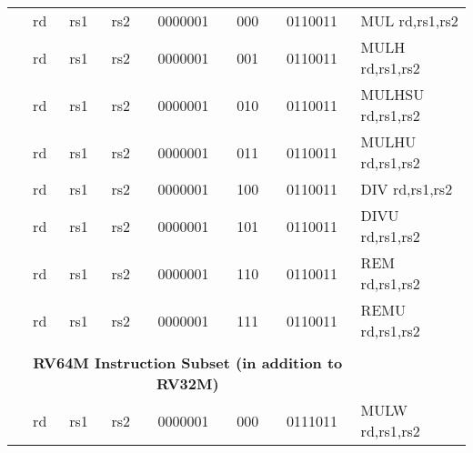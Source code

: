 \begin{table}[p]
\begin{small}
\begin{center}
\begin{tabular}{rccccccccccl}
&
\multicolumn{1}{|c|}{rd} &
\multicolumn{1}{c|}{rs1} &
\multicolumn{1}{c|}{rs2} &
\multicolumn{4}{c|}{0000001} &
\multicolumn{2}{c|}{000} &
\multicolumn{1}{c|}{0110011} & MUL rd,rs1,rs2 \\
\cline{2-11}
  

&
\multicolumn{1}{|c|}{rd} &
\multicolumn{1}{c|}{rs1} &
\multicolumn{1}{c|}{rs2} &
\multicolumn{4}{c|}{0000001} &
\multicolumn{2}{c|}{001} &
\multicolumn{1}{c|}{0110011} & MULH rd,rs1,rs2 \\
\cline{2-11}
  

&
\multicolumn{1}{|c|}{rd} &
\multicolumn{1}{c|}{rs1} &
\multicolumn{1}{c|}{rs2} &
\multicolumn{4}{c|}{0000001} &
\multicolumn{2}{c|}{010} &
\multicolumn{1}{c|}{0110011} & MULHSU rd,rs1,rs2 \\
\cline{2-11}
  

&
\multicolumn{1}{|c|}{rd} &
\multicolumn{1}{c|}{rs1} &
\multicolumn{1}{c|}{rs2} &
\multicolumn{4}{c|}{0000001} &
\multicolumn{2}{c|}{011} &
\multicolumn{1}{c|}{0110011} & MULHU rd,rs1,rs2 \\
\cline{2-11}
  

&
\multicolumn{1}{|c|}{rd} &
\multicolumn{1}{c|}{rs1} &
\multicolumn{1}{c|}{rs2} &
\multicolumn{4}{c|}{0000001} &
\multicolumn{2}{c|}{100} &
\multicolumn{1}{c|}{0110011} & DIV rd,rs1,rs2 \\
\cline{2-11}
  

&
\multicolumn{1}{|c|}{rd} &
\multicolumn{1}{c|}{rs1} &
\multicolumn{1}{c|}{rs2} &
\multicolumn{4}{c|}{0000001} &
\multicolumn{2}{c|}{101} &
\multicolumn{1}{c|}{0110011} & DIVU rd,rs1,rs2 \\
\cline{2-11}
  

&
\multicolumn{1}{|c|}{rd} &
\multicolumn{1}{c|}{rs1} &
\multicolumn{1}{c|}{rs2} &
\multicolumn{4}{c|}{0000001} &
\multicolumn{2}{c|}{110} &
\multicolumn{1}{c|}{0110011} & REM rd,rs1,rs2 \\
\cline{2-11}
  

&
\multicolumn{1}{|c|}{rd} &
\multicolumn{1}{c|}{rs1} &
\multicolumn{1}{c|}{rs2} &
\multicolumn{4}{c|}{0000001} &
\multicolumn{2}{c|}{111} &
\multicolumn{1}{c|}{0110011} & REMU rd,rs1,rs2 \\
\cline{2-11}
  

&
\multicolumn{10}{c}{} & \\
&
\multicolumn{10}{c}{\bf RV64M Instruction Subset (in addition to RV32M)} & \\
\cline{2-11}
  

&
\multicolumn{1}{|c|}{rd} &
\multicolumn{1}{c|}{rs1} &
\multicolumn{1}{c|}{rs2} &
\multicolumn{4}{c|}{0000001} &
\multicolumn{2}{c|}{000} &
\multicolumn{1}{c|}{0111011} & MULW rd,rs1,rs2 \\
\cline{2-11}
  


\end{tabular}
\end{center}
\end{small}
\end{table}
